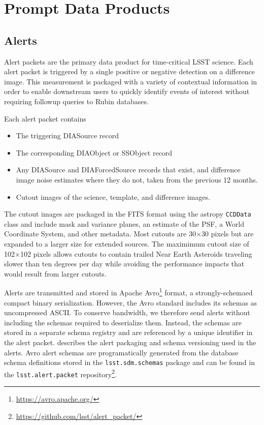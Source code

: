 \section{Prompt Data Products} \label{sec:data-products}






\subsection{Alerts} \label{sec:alerts}

Alert packets are the primary data product for time-critical LSST science.
Each alert packet is triggered by a single positive or negative detection on a difference image.
This measurement is packaged with a variety of contextual information in order to enable downstream users to quickly identify events of interest without requiring followup queries to Rubin databases.

Each alert packet contains

\begin{itemize}
    \item The triggering DIASource record
    \item The corresponding DIAObject or SSObject record
    \item Any DIASource and DIAForcedSource records that exist, and difference image noise estimates where they do not, taken from the previous 12 months.
    \item Cutout images of the science, template, and difference images.
\end{itemize}

The cutout images are packaged in the FITS format using the astropy \texttt{CCDData} class and include mask and variance planes, an estimate of the PSF, a World Coordinate System, and other metadata.
Most cutouts are 30$\times$30 pixels but are expanded to a larger size for extended sources.
The maximimum cutout size of 102$\times$102 pixels allows cutouts to contain trailed Near Earth Asteroids traveling slower than ten degrees per day while avoiding the performance impacts that would result from larger cutouts.

Alerts are transmitted and stored in Apache Avro\footnote{\url{https://avro.apache.org/}} format, a strongly-schemaed compact binary serialization.
However, the Avro standard includes its schemas as uncompressed ASCII.
To conserve bandwidth, we therefore send alerts without including the schemas required to deserialize them.
Instead, the schemas are stored in a separate schema registry and are referenced by a unique identifier in the alert packet.
\citep{DMTN-093} describes the alert packaging and schema versioning used in the alerts.
Avro alert schemas are programatically generated from the database schema definitions stored in the \texttt{lsst.sdm.schemas} package and can be found in the \texttt{lsst.alert.packet} repository\footnote{\url{https://github.com/lsst/alert_packet/}}.

